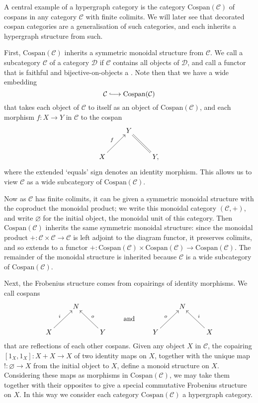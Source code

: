 \begin{example}
  A central example of a hypergraph category is the category
  $\mathrm{Cospan(\mathcal C)}$ of cospans in any category $\mathcal C$ with
  finite colimits. We will later see that decorated cospan categories are a
  generalisation of such categories, and each inherits a hypergraph structure
  from such. 

  First, $\mathrm{Cospan(\mathcal C)}$ inherits a symmetric monoidal structure
  from $\mathcal C$. We call a subcategory $\mathcal C$ of a category $\mathcal
  D$  if $\mathcal C$ contains all objects of $\mathcal D$, and
  call a functor that is faithful and bijective-on-objects a . Note then that we have a wide embedding
  \[
    \mathcal C \hooklongrightarrow \mathrm{Cospan(\mathcal C)}
  \]
  that takes each object of $\mathcal C$ to itself as an object of
  $\mathrm{Cospan(\mathcal C)}$, and each morphism $f\colon  X \to Y$ in $\mathcal C$
  to the cospan
  \[
    \xymatrix{
      & Y \\
      X \ar[ur]^{f} && Y, \ar@{=}[ul]
    }
  \]
  where the extended `equals' sign denotes an identity morphism. This allows us
  to view $\mathcal C$ as a wide subcategory of $\mathrm{Cospan(\mathcal C)}$.

  Now as $\mathcal C$ has finite colimits, it can be given a symmetric monoidal
  structure with the coproduct the monoidal product; we write this monoidal
  category $(\mathcal C,+)$, and write $\varnothing$ for the initial object, the
  monoidal unit of this category. Then $\mathrm{Cospan(\mathcal C)}$ inherits
  the same symmetric monoidal structure: since the monoidal product $+\colon \mathcal
  C \times \mathcal C \to \mathcal C$ is left adjoint to the diagram functor, it
  preserves colimits, and so extends to a functor $+\colon
  \mathrm{Cospan(\mathcal C)} \times \mathrm{Cospan(\mathcal C)} \to
  \mathrm{Cospan(\mathcal C)}$. The remainder of the monoidal structure is
  inherited because $\mathcal C$ is a wide subcategory of
  $\mathrm{Cospan(\mathcal C)}$.

  Next, the Frobenius structure comes from copairings of identity morphisms. We
  call cospans 
  \[
    \xymatrix{
      & N \\
      X \ar[ur]^{i} && Y \ar[ul]_{o}
    }
    \qquad \xymatrix@R=8pt{\\\textrm{and}} \qquad 
    \xymatrix{
      & N \\
      Y \ar[ur]^{o} && X \ar[ul]_{i}
    }
  \]
  that are reflections of each other  cospans. Given any object
  $X$ in $\mathcal C$, the copairing $[1_X,1_X]\colon  X + X \to X$ of two identity
  maps on $X$, together with the unique map $!\colon  \varnothing \to X$ from the
  initial object to $X$, define a monoid structure on $X$. Considering these
  maps as morphisms in $\mathrm{Cospan(\mathcal C)}$, we may take them together
  with their opposites to give a special commutative Frobenius structure on $X$.
  In this way we consider each category $\mathrm{Cospan(\mathcal C)}$ a
  hypergraph category.


\end{example}
